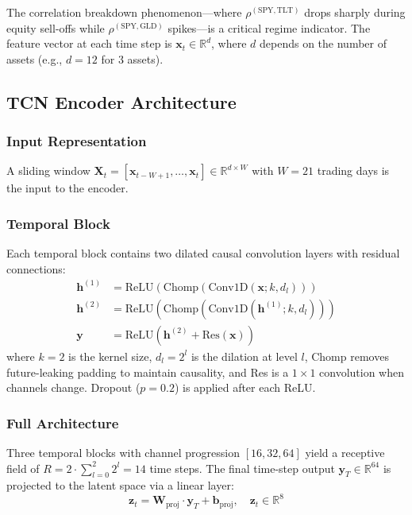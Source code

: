 \documentclass[conference, twocolumn]{IEEEtran}
\begin{document}
The correlation breakdown phenomenon---where $\rho^{(\text{SPY},\text{TLT})}$ drops sharply during equity sell-offs while $\rho^{(\text{SPY},\text{GLD})}$ spikes---is a critical regime indicator. The feature vector at each time step is $\mathbf{x}_t \in \mathbb{R}^d$, where $d$ depends on the number of assets (e.g., $d = 12$ for 3 assets).

\subsection{TCN Encoder Architecture}
\label{sec:tcn}

\subsubsection{Input Representation}
A sliding window $\mathbf{X}_t = [\mathbf{x}_{t-W+1}, \ldots, \mathbf{x}_t] \in \mathbb{R}^{d \times W}$ with $W = 21$ trading days is the input to the encoder.

\subsubsection{Temporal Block}
Each temporal block contains two dilated causal convolution layers with residual connections:
\begin{align}
    \mathbf{h}^{(1)} &= \text{ReLU}\!\left(\text{Chomp}\!\left(\text{Conv1D}(\mathbf{x}; k, d_l)\right)\right) \\
    \mathbf{h}^{(2)} &= \text{ReLU}\!\left(\text{Chomp}\!\left(\text{Conv1D}(\mathbf{h}^{(1)}; k, d_l)\right)\right) \\
    \mathbf{y} &= \text{ReLU}\!\left(\mathbf{h}^{(2)} + \text{Res}(\mathbf{x})\right)
\end{align}
where $k=2$ is the kernel size, $d_l = 2^l$ is the dilation at level $l$, Chomp removes future-leaking padding to maintain causality, and Res is a $1 \times 1$ convolution when channels change. Dropout ($p=0.2$) is applied after each ReLU.

\subsubsection{Full Architecture}
Three temporal blocks with channel progression $[16, 32, 64]$ yield a receptive field of $R = 2 \cdot \sum_{l=0}^{2} 2^l = 14$ time steps. The final time-step output $\mathbf{y}_T \in \mathbb{R}^{64}$ is projected to the latent space via a linear layer:
\begin{equation}
    \mathbf{z}_t = \mathbf{W}_{\text{proj}} \cdot \mathbf{y}_T + \mathbf{b}_{\text{proj}}, \quad \mathbf{z}_t \in \mathbb{R}^8
\label{eq:projection}
\end{equation}
\end{document}
